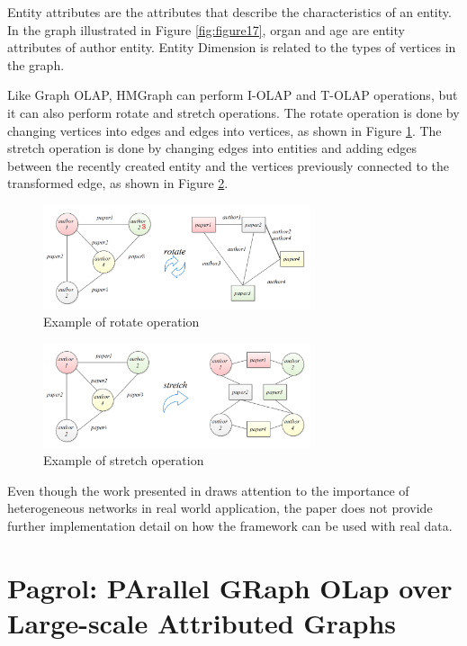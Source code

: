 Entity attributes are the attributes that describe the characteristics of an entity. In the graph illustrated in Figure \ref{fig:figure17}, organ and age are entity attributes of author entity. Entity Dimension is related to the types of vertices in the graph.

Like Graph OLAP, HMGraph can perform I-OLAP and T-OLAP operations, but it can also perform rotate and stretch operations. The rotate operation is done by changing vertices into edges and edges into vertices, as shown in Figure  \ref{fig:figure18}. The stretch operation is done by changing edges into entities and adding edges between the recently created entity and the vertices previously connected to the transformed edge, as shown in Figure \ref{fig:figure19}.

\begin{figure}[ht]
\centering
\includegraphics[width=0.7\textwidth]{../rotate_operation_example.png}
\caption{Example of rotate operation \cite{Yin2012}}
\label{fig:figure18}
\end{figure}

\begin{figure}[ht]
\centering
\includegraphics[width=0.7\textwidth]{../stretch_operation_example.png}
\caption{Example of stretch operation \cite{Yin2012}}
\label{fig:figure19}
\end{figure}

Even though the work presented in \cite{Yin2012} draws attention to the importance of heterogeneous networks in real world application, the paper does not provide further implementation detail on how the framework can be used with real data.

\section{Pagrol: PArallel GRaph OLap over Large-scale Attributed Graphs}

